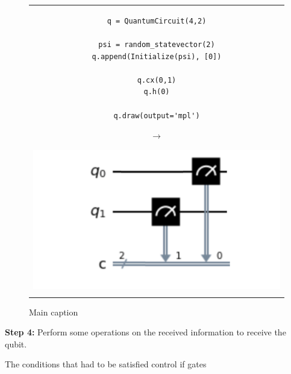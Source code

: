 \begin{figure}[h]
\centering
\begin{tabular}{c}
\begin{minipage}[c]{.45\linewidth}
\begin{verbatim}
q = QuantumCircuit(4,2)

psi = random_statevector(2)
q.append(Initialize(psi), [0])

q.cx(0,1)
q.h(0)

q.draw(output='mpl')
\end{verbatim}
\end{minipage}
\begin{minipage}[c]{.1\linewidth}
\centering
$\rightarrow$
\end{minipage}
\begin{minipage}[c]{.4\linewidth}
\centering
\includegraphics[width=\textwidth]{lab3/images/Step3.png}
\end{minipage}\\
\\ %
\end{tabular}
\caption{Main caption}
\label{step3}
\end{figure}

\textbf{Step 4:} Perform some operations on the received information to receive the qubit.

The conditions that had to be satisfied
control if gates

